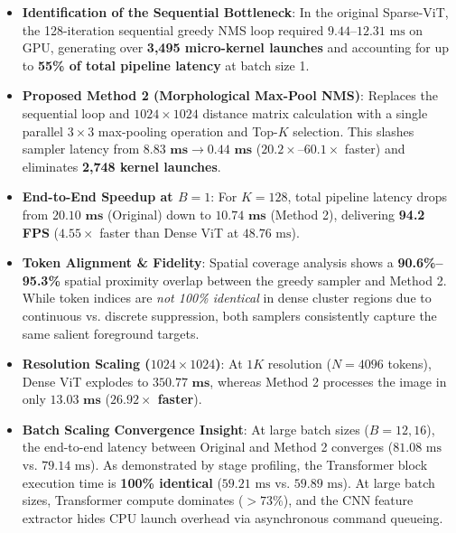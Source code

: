 \documentclass[11pt,a4paper]{article}
\begin{document}
\begin{tcolorbox}[colback=white,colframe=cardborder,arc=2mm,boxrule=0.8pt]
\begin{itemize}[leftmargin=*,itemsep=4pt]
    \item \textbf{Identification of the Sequential Bottleneck}: In the original Sparse-ViT, the 128-iteration sequential greedy NMS loop required $9.44\text{--}12.31\text{ ms}$ on GPU, generating over \textbf{3,495 micro-kernel launches} and accounting for up to \textbf{55\% of total pipeline latency} at batch size 1.
    \item \textbf{Proposed Method 2 (Morphological Max-Pool NMS)}: Replaces the sequential loop and $1024\times 1024$ distance matrix calculation with a single parallel $3\times 3$ max-pooling operation and Top-$K$ selection. This slashes sampler latency from $\mathbf{8.83\text{ ms} \rightarrow 0.44\text{ ms}}$ ($\mathbf{20.2\times\text{--}60.1\times}$ faster) and eliminates \textbf{2,748 kernel launches}.
    \item \textbf{End-to-End Speedup at $B=1$}: For $K=128$, total pipeline latency drops from $\mathbf{20.10\text{ ms}}$ (Original) down to $\mathbf{10.74\text{ ms}}$ (Method 2), delivering \textbf{94.2 FPS} ($\mathbf{4.55\times}$ faster than Dense ViT at $48.76\text{ ms}$).
    \item \textbf{Token Alignment \& Fidelity}: Spatial coverage analysis shows a \textbf{90.6\%--95.3\%} spatial proximity overlap between the greedy sampler and Method 2. While token indices are \textit{not 100\% identical} in dense cluster regions due to continuous vs. discrete suppression, both samplers consistently capture the same salient foreground targets.
    \item \textbf{Resolution Scaling ($1024\times 1024$)}: At $1K$ resolution ($N=4096$ tokens), Dense ViT explodes to $\mathbf{350.77\text{ ms}}$, whereas Method 2 processes the image in only $\mathbf{13.03\text{ ms}}$ (\textbf{$26.92\times$ faster}).
    \item \textbf{Batch Scaling Convergence Insight}: At large batch sizes ($B=12, 16$), the end-to-end latency between Original and Method 2 converges ($81.08\text{ ms}$ vs. $79.14\text{ ms}$). As demonstrated by stage profiling, the Transformer block execution time is \textbf{100\% identical} ($59.21\text{ ms}$ vs. $59.89\text{ ms}$). At large batch sizes, Transformer compute dominates ($>73\%$), and the CNN feature extractor hides CPU launch overhead via asynchronous command queueing.
\end{itemize}
\end{tcolorbox}
\end{document}
